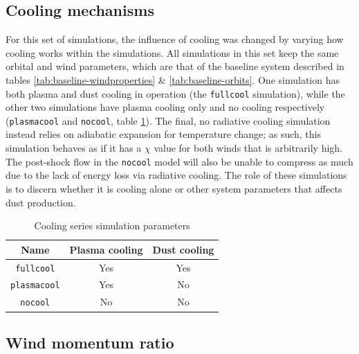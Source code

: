 \subsection{Cooling mechanisms}

For this set of simulations, the influence of cooling was changed by varying how cooling works within the simulations.
All simulations in this set keep the same orbital and wind parameters, which are that of the baseline system described in tables \ref{tab:baseline-windproperties} \& \ref{tab:baseline-orbits}.
One simulation has both plasma and dust cooling in operation (the \texttt{fullcool} simulation), while the other two simulations have plasma cooling only and no cooling respectively (\texttt{plasmacool} and \texttt{nocool}, table \ref{tab:cooling-param}).
The final, no radiative cooling simulation instead relies on adiabatic expansion for temperature change; as such, this simulation behaves as if it has a $\chi$ value for both winds that is arbitrarily high.
The post-shock flow in the \texttt{nocool} model will also be unable to compress as much due to the lack of energy loss via radiative cooling.
The role of these simulations is to discern whether it is cooling alone or other system parameters that affects dust production.


\begin{table}
  \centering
  \begin{tabular}{ccc}
    \hline
    Name & Plasma cooling & Dust cooling \\
    \hline
    \texttt{fullcool} & Yes & Yes \\ 
    \texttt{plasmacool} & Yes & No \\
    \texttt{nocool} & No & No \\
    \hline
  \end{tabular}
  \caption{Cooling series simulation parameters}
  \label{tab:cooling-param}
\end{table}

\subsection{Wind momentum ratio}

